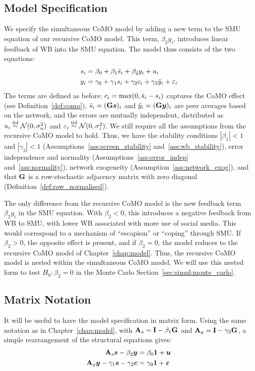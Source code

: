 \subsection{Model Specification}
\label{sec:simul:specification}
We specify the simultaneous CoMO model by adding a new term to the SMU equation of our recursive CoMO model. This term, $\beta_2 y_i$, introduces linear feedback of WB into the SMU equation. The model thus consists of the two equations:
\begin{align}
\label{eq:simul_screen}
    s_i &= \beta_0 + \beta_1\bar{s}_i + \beta_2 y_i + u_i \\
\label{eq:simul_wb}
    y_i &= \gamma_0 + \gamma_1 s_i + \gamma_2 c_i + \gamma_3\bar{y}_i + \varepsilon_i
\end{align}
The terms are defined as before: $c_i = \max(0, \bar{s}_i - s_i)$ captures the CoMO effect (see Definition~\ref{def:como}), $\bar{s}_i = (\mathbf{G}\bm{s})_i$ and $\bar{y}_i = (\mathbf{G}\bm{y})_i$ are peer averages based on the network, and the errors are mutually independent, distributed as $u_i \stackrel{\text{iid}}{\sim} \mathcal{N}(0, \sigma_u^2)$ and $\varepsilon_i \stackrel{\text{iid}}{\sim} \mathcal{N}(0, \sigma_\varepsilon^2)$. We still require all the assumptions from the recursive CoMO model to hold. Thus, we have the stability conditions $|\beta_1| < 1$ and $|\gamma_3| < 1$ (Assumptions~\ref{ass:screen_stability} and~\ref{ass:wb_stability}), error independence and normality (Assumptions~\ref{ass:error_indep} and~\ref{ass:normality}), network exogeneity (Assumption~\ref{ass:network_exog}), and that $\mathbf{G}$ is a row-stochastic adjacency matrix with zero diagonal (Definition~\ref{def:row_normalised}).

The only difference from the recursive CoMO model is the new feedback term $\beta_2 y_i$ in the SMU equation. With $\beta_2 < 0$, this introduces a negative feedback from WB to SMU, with lower WB associated with more use of social media. This would correspond to a mechanism of ``escapism'' or ``coping'' through SMU\@. If $\beta_2 > 0$, the opposite effect is present, and if $\beta_2 = 0$, the model reduces to the recursive CoMO model of Chapter~\ref{chap:model}. Thus, the recursive CoMO model is nested within the simultaneous CoMO model. We will use this nested form to test $H_0: \beta_2 = 0$ in the Monte Carlo Section~\ref{sec:simul:monte_carlo}.

\subsection{Matrix Notation}
\label{sec:simul:matrix}
It will be useful to have the model specification in matrix form. Using the same notation as in Chapter~\ref{chap:model}, with $\mathbf{A}_s = \mathbf{I} - \beta_1\mathbf{G}$ and $\mathbf{A}_y = \mathbf{I} - \gamma_3\mathbf{G}$, a simple rearrangement of the structural equations gives:
\begin{align}
\label{eq:simul_screen_matrix}
    \mathbf{A}_s\bm{s} - \beta_2\bm{y} &= \beta_0\bm{1} + \bm{u} \\
\label{eq:simul_wb_matrix}
    \mathbf{A}_y\bm{y} - \gamma_1\bm{s} - \gamma_2\bm{c} &= \gamma_0\bm{1} + \bm{\varepsilon}
\end{align}

